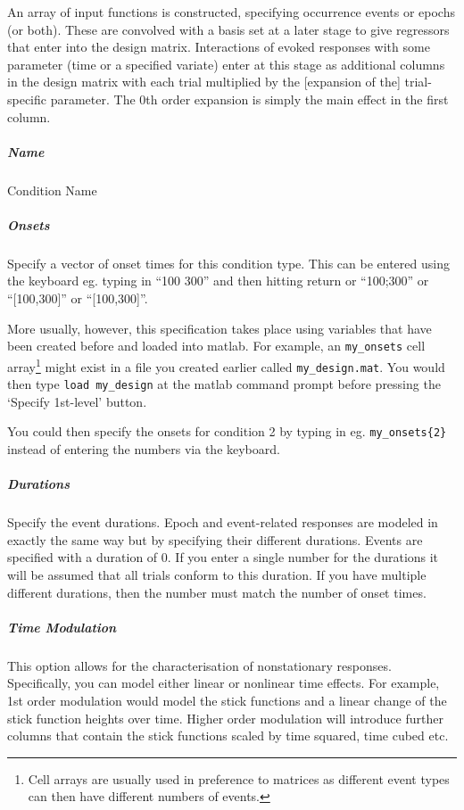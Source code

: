 An array of input functions is constructed, specifying occurrence events or epochs (or both). These are convolved with a basis set at a later stage to give regressors that enter into the design matrix. Interactions of evoked responses with some parameter (time or a specified variate) enter at this stage as additional columns in the design matrix with each trial multiplied by the [expansion of the] trial-specific parameter. The 0th order expansion is simply the main effect in the first column.

\subparagraph{Name}

Condition Name

\subparagraph{Onsets}

Specify a vector of onset times for this condition type. This can be entered using the keyboard eg. typing in ``100 300'' and then hitting return or ``100;300'' or ``[100,300]'' or ``[100,300]''.

More usually, however, this specification takes place using variables that have been created before and loaded into matlab. For example, an \verb!my_onsets! cell array\footnote{Cell arrays are usually used in preference to matrices as different event types can then have different numbers of events.} might exist in a file you created earlier called \verb!my_design.mat!. You would then type \verb!load my_design! at the matlab command prompt before pressing the `Specify 1st-level' button. 

You could then specify the onsets for condition 2 by typing in eg. \verb!my_onsets{2}! instead of entering the numbers via the keyboard.


\subparagraph{Durations}

Specify the event durations. Epoch and event-related responses are modeled in exactly the same way but by specifying their different durations.  Events are specified with a duration of 0.  If you enter a single number for the durations it will be assumed that all trials conform to this duration. If you have multiple different durations, then the number must match the number of onset times.

\subparagraph{Time Modulation}

This option allows for the characterisation of nonstationary responses. Specifically, you can model either linear or nonlinear time effects. For example, 1st order modulation would model the stick functions and a linear change of the stick function heights over time. Higher order modulation will introduce further columns that contain the stick functions scaled by time squared, time cubed etc.

